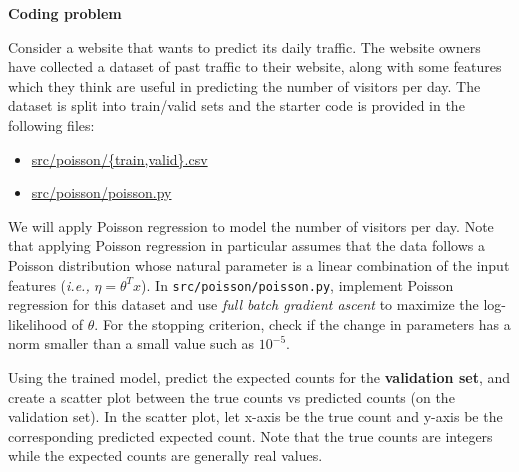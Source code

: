 \item {} \textbf{Coding problem}

Consider a website that wants to predict its
daily traffic. The website owners have collected a dataset of past traffic to
their website, along with some features which they think are useful in
predicting the number of visitors per day. The dataset is split into
train/valid sets and the starter code is provided in the following files:
\begin{center}
\begin{itemize}
\item 	\url{src/poisson/{train,valid}.csv}
\item   \url{src/poisson/poisson.py}
\end{itemize}
\end{center}
We will apply Poisson regression to model the number of visitors per day.
Note that applying Poisson regression in particular assumes that the data
follows a Poisson distribution whose natural parameter is a linear
combination of the input features (\emph{i.e.,} $\eta = \theta^T x$).
In \texttt{src/poisson/poisson.py}, implement Poisson regression for this dataset
and use \emph{full batch gradient ascent} to maximize the log-likelihood of $\theta$. For the
stopping criterion, check if the change in parameters has a norm smaller than
a small value such as $10^{-5}$.

Using the trained model, predict the expected counts for the \textbf{validation set}, and
create a scatter plot between the true counts vs predicted counts (on the
validation set). In the scatter plot, let x-axis be the true count and y-axis
be the corresponding predicted expected count. Note that the true counts
are integers while the expected counts are generally real values.
